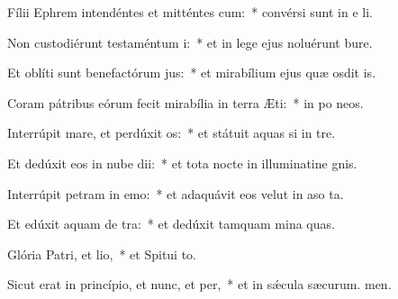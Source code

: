 \item Fílii Ephrem intendéntes et mitténtes cum:~* convérsi sunt in e li.
\item Non custodiérunt testaméntum i:~* et in lege ejus noluérunt bure.
\item Et oblíti sunt benefactórum jus:~* et mirabílium ejus quæ osdit is.
\item Coram pátribus eórum fecit mirabília in terra Æti:~* in po neos.
\item Interrúpit mare, et perdúxit os:~* et státuit aquas si in tre.
\item Et dedúxit eos in nube dii:~* et tota nocte in illuminatine gnis.
\item Interrúpit petram in emo:~* et adaquávit eos velut in aso ta.
\item Et edúxit aquam de tra:~* et dedúxit tamquam mina quas.
\item Glória Patri, et lio,~* et Spitui to.
\item Sicut erat in princípio, et nunc, et per,~* et in sǽcula sæcurum. men.
